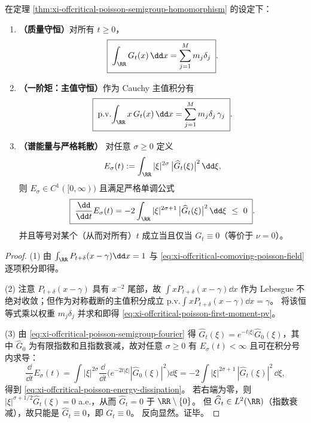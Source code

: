 \begin{theorem}\label{thm:xi-offcritical-poisson-conservation-dissipation}
在定理 \ref{thm:xi-offcritical-poisson-semigroup-homomorphism} 的设定下：
\begin{enumerate}
  \item \textbf{（质量守恒）}对所有 \(t\ge 0\)，
  \begin{equation}\label{eq:xi-offcritical-poisson-mass-conservation}
  \boxed{\;\int_{\RR}G_t(x)\,\dd x=\sum_{j=1}^{M}m_j\delta_j\; }.
  \end{equation}
  \item \textbf{（一阶矩：主值守恒）}作为 Cauchy 主值积分有
  \begin{equation}\label{eq:xi-offcritical-poisson-first-moment-pv}
  \boxed{\;\mathrm{p.v.}\!\int_{\RR}x\,G_t(x)\,\dd x=\sum_{j=1}^{M}m_j\delta_j\,\gamma_j\; }.
  \end{equation}
  \item \textbf{（谱能量与严格耗散）}
  对任意 \(\sigma\ge 0\) 定义
  \[
  E_\sigma(t):=\int_{\RR}|\xi|^{2\sigma}\,\bigl|\widehat G_t(\xi)\bigr|^2\,\dd\xi,
  \]
  则 \(E_\sigma\in C^1([0,\infty))\) 且满足严格单调公式
  \begin{equation}\label{eq:xi-offcritical-poisson-energy-dissipation}
  \boxed{\;
  \frac{\dd}{\dd t}E_\sigma(t)
  =-2\int_{\RR}|\xi|^{2\sigma+1}\,\bigl|\widehat G_t(\xi)\bigr|^2\,\dd\xi
  \ \le\ 0\; }.
  \end{equation}
  并且等号对某个（从而对所有）\(t\) 成立当且仅当 \(G_t\equiv 0\)（等价于 \(\nu=0\)）。
\end{enumerate}
\end{theorem}

\begin{proof}
(1) 由 \(\int_{\RR}P_{t+\delta}(x-\gamma)\dd x=1\) 与 \eqref{eq:xi-offcritical-comoving-poisson-field} 逐项积分即得。
\par
(2) 注意 \(P_{t+\delta}(x-\gamma)\) 具有 \(x^{-2}\) 尾部，故 \(\int xP_{t+\delta}(x-\gamma)\dd x\) 作为 Lebesgue 不绝对收敛；但作为对称截断的主值积分成立
\(
\mathrm{p.v.}\int xP_{t+\delta}(x-\gamma)\dd x=\gamma
\)。
将该恒等式乘以权重 \(m_j\delta_j\) 并求和即得 \eqref{eq:xi-offcritical-poisson-first-moment-pv}。
\par
(3) 由 \eqref{eq:xi-offcritical-poisson-semigroup-fourier} 得 \(\widehat G_t(\xi)=e^{-t|\xi|}\widehat G_0(\xi)\)，其中 \(\widehat G_0\) 为有限指数和且指数衰减，故对任意 \(\sigma\ge 0\) 有 \(E_\sigma(t)<\infty\) 且可在积分号内求导：
\[
\frac{\dd}{\dd t}E_\sigma(t)
=\int |\xi|^{2\sigma}\frac{\dd}{\dd t}\bigl(e^{-2t|\xi|}|\widehat G_0(\xi)|^2\bigr)\dd\xi
=-2\int |\xi|^{2\sigma+1}\,|\widehat G_t(\xi)|^2\,\dd\xi,
\]
得到 \eqref{eq:xi-offcritical-poisson-energy-dissipation}。
若右端为零，则 \( |\xi|^{\sigma+1/2}\widehat G_t(\xi)=0\) a.e.，从而 \(\widehat G_t=0\) 于 \(\RR\setminus\{0\}\)。
但 \(\widehat G_t\in L^2(\RR)\)（指数衰减），故只能是 \(\widehat G_t\equiv 0\)，即 \(G_t\equiv 0\)。
反向显然。证毕。
\end{proof}

